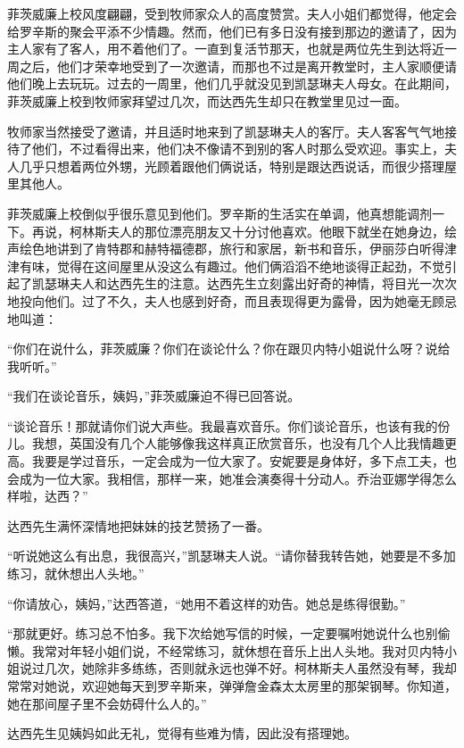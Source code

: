\par 菲茨威廉上校风度翩翩，受到牧师家众人的高度赞赏。夫人小姐们都觉得，他定会给罗辛斯的聚会平添不少情趣。然而，他们已有多日没有接到那边的邀请了，因为主人家有了客人，用不着他们了。一直到复活节那天，也就是两位先生到达将近一周之后，他们才荣幸地受到了一次邀请，而那也不过是离开教堂时，主人家顺便请他们晚上去玩玩。过去的一周里，他们几乎就没见到凯瑟琳夫人母女。在此期间，菲茨威廉上校到牧师家拜望过几次，而达西先生却只在教堂里见过一面。
\par 牧师家当然接受了邀请，并且适时地来到了凯瑟琳夫人的客厅。夫人客客气气地接待了他们，不过看得出来，他们决不像请不到别的客人时那么受欢迎。事实上，夫人几乎只想着两位外甥，光顾着跟他们俩说话，特别是跟达西说话，而很少搭理屋里其他人。
\par 菲茨威廉上校倒似乎很乐意见到他们。罗辛斯的生活实在单调，他真想能调剂一下。再说，柯林斯夫人的那位漂亮朋友又十分讨他喜欢。他眼下就坐在她身边，绘声绘色地讲到了肯特郡和赫特福德郡，旅行和家居，新书和音乐，伊丽莎白听得津津有味，觉得在这间屋里从没这么有趣过。他们俩滔滔不绝地谈得正起劲，不觉引起了凯瑟琳夫人和达西先生的注意。达西先生立刻露出好奇的神情，将目光一次次地投向他们。过了不久，夫人也感到好奇，而且表现得更为露骨，因为她毫无顾忌地叫道：
\par “你们在说什么，菲茨威廉？你们在谈论什么？你在跟贝内特小姐说什么呀？说给我听听。”
\par “我们在谈论音乐，姨妈，”菲茨威廉迫不得已回答说。
\par “谈论音乐！那就请你们说大声些。我最喜欢音乐。你们谈论音乐，也该有我的份儿。我想，英国没有几个人能够像我这样真正欣赏音乐，也没有几个人比我情趣更高。我要是学过音乐，一定会成为一位大家了。安妮要是身体好，多下点工夫，也会成为一位大家。我相信，那样一来，她准会演奏得十分动人。乔治亚娜学得怎么样啦，达西？”
\par 达西先生满怀深情地把妹妹的技艺赞扬了一番。
\par “听说她这么有出息，我很高兴，”凯瑟琳夫人说。“请你替我转告她，她要是不多加练习，就休想出人头地。”
\par “你请放心，姨妈，”达西答道，“她用不着这样的劝告。她总是练得很勤。”
\par “那就更好。练习总不怕多。我下次给她写信的时候，一定要嘱咐她说什么也别偷懒。我常对年轻小姐们说，不经常练习，就休想在音乐上出人头地。我对贝内特小姐说过几次，她除非多练练，否则就永远也弹不好。柯林斯夫人虽然没有琴，我却常常对她说，欢迎她每天到罗辛斯来，弹弹詹金森太太房里的那架钢琴。你知道，她在那间屋子里不会妨碍什么人的。”
\par 达西先生见姨妈如此无礼，觉得有些难为情，因此没有搭理她。
